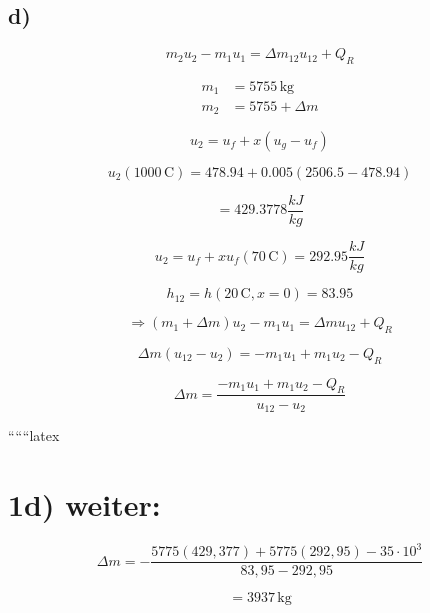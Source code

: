 

\subsection*{d)}

\begin{equation*}
m_2 u_2 - m_1 u_1 = \Delta m_{12} u_{12} + Q_R
\end{equation*}

\begin{align*}
m_1 &= 5755 \, \text{kg} \\
m_2 &= 5755 + \Delta m
\end{align*}

\begin{equation*}
u_2 = u_f + x (u_g - u_f)
\end{equation*}

\begin{equation*}
u_2 (1000 \, \text{C}) = 478.94 + 0.005 \left( 2506.5 - 478.94 \right)
\end{equation*}

\begin{equation*}
= 429.3778 \frac{kJ}{kg}
\end{equation*}

\begin{equation*}
u_2 = u_f + x u_f (70 \, \text{C}) = 292.95 \frac{kJ}{kg}
\end{equation*}

\begin{equation*}
h_{12} = h (20 \, \text{C}, x = 0) = 83.95
\end{equation*}

\begin{equation*}
\Rightarrow (m_1 + \Delta m) u_2 - m_1 u_1 = \Delta m u_{12} + Q_R
\end{equation*}

\begin{equation*}
\Delta m (u_{12} - u_2) = -m_1 u_1 + m_1 u_2 - Q_R
\end{equation*}

\begin{equation*}
\Delta m = \frac{-m_1 u_1 + m_1 u_2 - Q_R}{u_{12} - u_2}
\end{equation*}

``````latex

\section*{1d) weiter:}

\[
\Delta m = - \frac{5775 (429,377) + 5775 (292,95) - 35 \cdot 10^3}{83,95 - 292,95}
\]

\[
= 3937 \, \text{kg}
\]